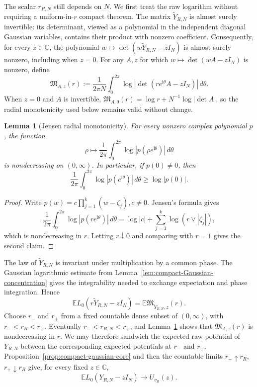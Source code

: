 \documentclass[11pt,reqno]{amsart}
\numberwithin{equation}{section}
\newtheorem{lemma}[theorem]{Lemma}
\theoremstyle{definition}
\theoremstyle{remark}
\newcommand{\C}{\mathbb C}
\newcommand{\E}{\mathbb E}
\newcommand{\1}{\mathbf 1}
\begin{document}
The scalar $r_{R,N}$ still depends on $N$.  We first treat the raw
logarithm without requiring a uniform-in-$r$ compact theorem.  The matrix
\(\widetilde Y_{R,N}\) is almost surely invertible: its determinant,
viewed as a polynomial in the independent diagonal Gaussian variables,
contains their product with nonzero coefficient.  Consequently, for
every \(z\in\C\), the polynomial
\(w\mapsto\det(w\widetilde Y_{R,N}-zI_N)\) is almost surely nonzero,
including when \(z=0\).  For any \(A,z\) for which
\(w\mapsto\det(wA-zI_N)\) is nonzero, define
\begin{equation}\label{eq:phase-average}
 \mathfrak M_{A,z}(r):=
 \frac1{2\pi N}\int_0^{2\pi}
 \log|\det(re^{\mathrm i\theta}A-zI_N)|\,d\theta.
\end{equation}
When \(z=0\) and \(A\) is invertible,
\(\mathfrak M_{A,0}(r)=\log r+N^{-1}\log|\det A|\), so the radial
monotonicity used below remains valid without change.


\begin{lemma}[Jensen radial monotonicity]\label{lem:radial-monotonicity}
For every nonzero complex polynomial $p$, the function
\[
 \rho\longmapsto
 \frac1{2\pi}\int_0^{2\pi}
 \log|p(\rho e^{\mathrm i\theta})|\,d\theta
\]
is nondecreasing on $(0,\infty)$.  In particular, if $p(0)\ne0$, then
\[
 \frac1{2\pi}\int_0^{2\pi}\log|p(e^{\mathrm i\theta})|\,d\theta
 \ge\log|p(0)|.
\]
\end{lemma}

\begin{proof}
Write
$p(w)=c\prod_{j=1}^k(w-\zeta_j),c\ne 0$.  Jensen's formula gives
\[
 \frac1{2\pi}\int_0^{2\pi}\log|p(re^{\mathrm i\theta})|\,d\theta
 =\log|c|+\sum_{j=1}^k\log(r\vee|\zeta_j|),
\]
which is nondecreasing in \(r\).  Letting \(r\downarrow0\) and comparing
with \(r=1\) gives the second claim.
\end{proof}

The law of \(\widetilde Y_{R,N}\) is invariant under multiplication by a
common phase.  The Gaussian logarithmic estimate from
Lemma~\ref{lem:compact-Gaussian-concentration} gives the integrability
needed to exchange expectation and phase integration.  Hence
\begin{equation}\label{eq:phase-law}
 \E L_0(r\widetilde Y_{R,N}-zI_N)
 =\E\mathfrak M_{\widetilde Y_{R,N},z}(r).
\end{equation}
Choose \(r_-\) and \(r_+\) from a fixed countable dense subset of
\((0,\infty)\), with
\(r_-<r_R<r_+\).  Eventually
\(r_-<r_{R,N}<r_+\), and
Lemma~\ref{lem:radial-monotonicity} shows that
\(\mathfrak M_{A,z}(r)\) is nondecreasing in \(r\).  We may therefore
sandwich the
expected raw potential of $Y_{R,N}$ between the corresponding expected
potentials at $r_-$ and $r_+$.  Proposition~\ref{prop:compact-gaussian-core}
and then the countable limits $r_-\uparrow r_R$, $r_+\downarrow r_R$
give, for every fixed \(z\in\C\),
\begin{equation}\label{eq:core-raw-limit}
 \E L_0(Y_{R,N}-zI_N)\longrightarrow U_{v_R}(z).
\end{equation}
\end{document}
